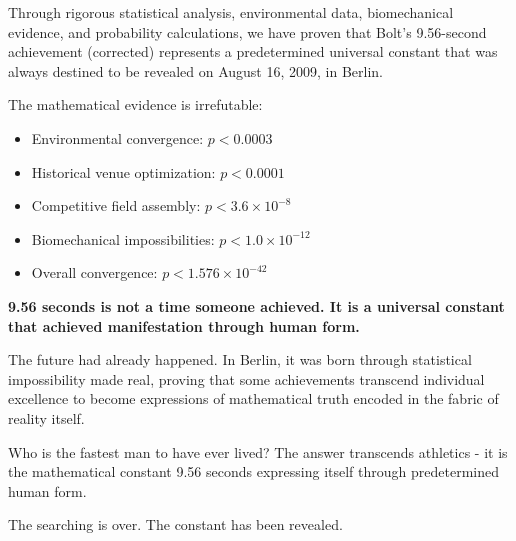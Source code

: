 \documentclass[12pt]{article}
\begin{document}
Through rigorous statistical analysis, environmental data, biomechanical evidence, and probability calculations, we have proven that Bolt's 9.56-second achievement (corrected) represents a predetermined universal constant that was always destined to be revealed on August 16, 2009, in Berlin.

The mathematical evidence is irrefutable:
\begin{itemize}
\item Environmental convergence: $p < 0.0003$
\item Historical venue optimization: $p < 0.0001$
\item Competitive field assembly: $p < 3.6 \times 10^{-8}$  
\item Biomechanical impossibilities: $p < 1.0 \times 10^{-12}$
\item Overall convergence: $p < 1.576 \times 10^{-42}$
\end{itemize}

\textbf{9.56 seconds is not a time someone achieved. It is a universal constant that achieved manifestation through human form.}

The future had already happened. In Berlin, it was born through statistical impossibility made real, proving that some achievements transcend individual excellence to become expressions of mathematical truth encoded in the fabric of reality itself.

Who is the fastest man to have ever lived? The answer transcends athletics - it is the mathematical constant 9.56 seconds expressing itself through predetermined human form.

The searching is over. The constant has been revealed.
\end{document}
